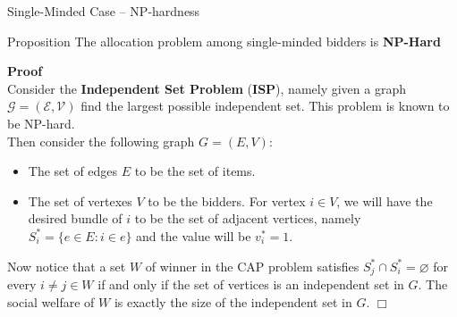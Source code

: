 \documentclass[aspectratio=169,xcolor=dvipsnames]{beamer}
\begin{document}
    
    \begin{frame}{Single-Minded Case – NP-hardness}
    \begin{block}{Proposition}
    The allocation problem among single-minded bidders is \textbf{NP-Hard}
    \end{block}
    \textbf{Proof}\\
    Consider the \textbf{Independent Set Problem} (\textbf{ISP}), namely given a graph $\mathcal{G} = (\mathcal{E},\mathcal{V})$ find the largest possible independent set. This problem is known to be NP-hard.\\
    Then consider the following graph $G = (E,V)$:
    \begin{itemize}
        \item The set of edges $E$ to be the set of items.
        \item The set of vertexes $V$ to be the bidders. For vertex $i \in V$, we will have the desired bundle of $i$ to be the set of adjacent vertices, namely $S^*_i = \{e \in E : i \in e\}$ and the value will be $v^*_i = 1$.
    \end{itemize}
    Now notice that a set $W$ of winner in the CAP problem satisfies $S^*_j \cap S^*_i = \varnothing$ for every $i \neq j \in W$ if and only if the set of vertices is an independent set in $G$. The social welfare of $W$ is exactly the size of the independent set in $G$. \hspace{1pt} $\Box$ 
    
    
    
    \end{frame}
\end{document}
